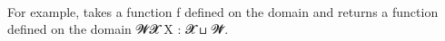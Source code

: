 \begin{code}
\>[1]\AgdaSpace{}%
\AgdaSymbol{:}\AgdaSpace{}%
\AgdaSymbol{\{}\AgdaSpace{}%
\AgdaSymbol{:}\AgdaSpace{}%
\AgdaSpace{}%
\AgdaSymbol{\}\{}\AgdaSpace{}%
\AgdaSymbol{:}\AgdaSpace{}%
\AgdaSpace{}%
\AgdaSymbol{\}}\AgdaSpace{}%
\AgdaSpace{}%
\AgdaSymbol{(}\AgdaSpace{}%
\AgdaSpace{}%
\AgdaSymbol{)}\AgdaSpace{}%
\AgdaSpace{}%
\AgdaSymbol{(}\AgdaSymbol{\{}\AgdaSymbol{\}\{}\AgdaSymbol{\}}\AgdaSpace{}%
\AgdaSpace{}%
\AgdaSpace{}%
\AgdaSymbol{\{}\AgdaSymbol{\}\{}\AgdaSymbol{\}}\AgdaSpace{}%
\AgdaSymbol{)}\<%
\\
%
\>[1]\AgdaSpace{}%
\AgdaSpace{}%
\AgdaSymbol{=}\AgdaSpace{}%
\AgdaSpace{}%
\AgdaSpace{}%
\AgdaSpace{}%
\AgdaSpace{}%
\AgdaSymbol{(}\AgdaSpace{}%
\AgdaSymbol{(}\AgdaSpace{}%
\AgdaSymbol{))}\<%
\end{code}
\ccpad
For example,  takes a function \ab f defined on the domain \AgdaSpace{}\AgdaSymbol{:}\AgdaSpace{}\AgdaSpace{}\AgdaSpace{} and returns a function defined on the domain \as{\{}\ab 𝓦\as{\}}\as{\{}\ab 𝓧\as{\}} \ab X \as : \ab 𝓧 \aop ⊔ \ab 𝓦\aof ̇.

